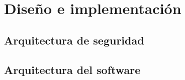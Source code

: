 
\chapter{Diseño e implementación} %

\label{Chapter4} %


\section{Arquitectura de seguridad}


\section{Arquitectura del software}
